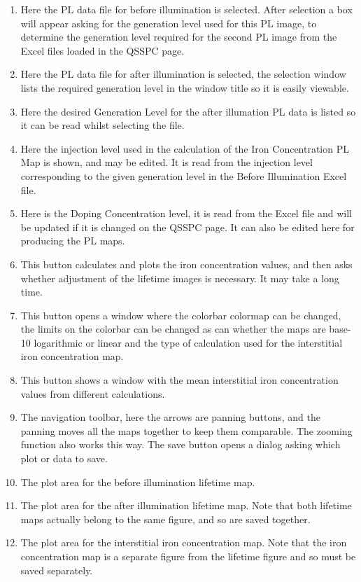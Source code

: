 \documentclass[final,a4paper,oneside,12pt]{article}
\begin{document}
\begin{enumerate}
\item Here the PL data file for before illumination is selected. After selection a box will appear asking for the generation level used for this PL image, to determine the generation level required for the second PL image from the Excel files loaded in the QSSPC page.
\item Here the PL data file for after illumination is selected, the selection window lists the required generation level in the window title so it is easily viewable.
\item  Here the desired Generation Level for the after illumation PL data is listed so it can be read whilst selecting the file.
\item Here the injection level used in the calculation of the Iron Concentration PL Map is shown, and may be edited. It is read from the injection level corresponding to the given generation level in the Before Illumination Excel file.
\item Here is the Doping Concentration level, it is read from the Excel file and will be updated if it is changed on the QSSPC page. It can also be edited here for producing the PL maps.
\item This button calculates and plots the iron concentration values, and then asks whether adjustment of the lifetime images is necessary. It may take a long time.
\item This button opens a window where the colorbar colormap can be changed, the limits on the colorbar can be changed as can whether the maps are base-10 logarithmic or linear and the type of calculation used for the interstitial iron concentration map.
\item This button shows a window with the mean interstitial iron concentration values from different calculations.
\item The navigation toolbar, here the arrows are panning buttons, and the panning moves all the maps together to keep them comparable. The zooming function also works this way. The save button opens a dialog asking which plot or data to save.
\item The plot area for the before illumination lifetime map.
\item The plot area for the after illumination lifetime map. Note that both lifetime maps actually belong to the same figure, and so are saved together.
\item The plot area for the interstitial iron concentration map. Note that the iron concentration map is a separate figure from the lifetime figure and so must be saved separately.

\end{enumerate}
\end{document}
